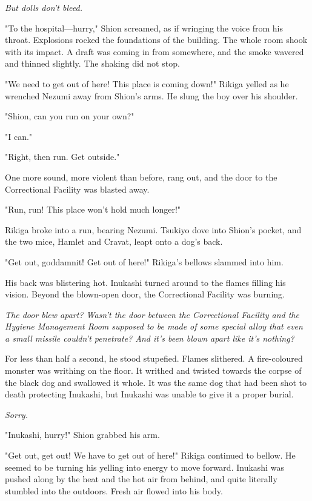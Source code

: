 \emph{But dolls don't bleed.}

"To the hospital---hurry," Shion screamed, as if wringing the voice from
his throat. Explosions rocked the foundations of the building. The whole
room shook with its impact. A draft was coming in from somewhere, and
the smoke wavered and thinned slightly. The shaking did not stop.

"We need to get out of here! This place is coming down!" Rikiga yelled
as he wrenched Nezumi away from Shion's arms. He slung the boy over his
shoulder.

"Shion, can you run on your own?"

"I can."

"Right, then run. Get outside."

One more sound, more violent than before, rang out, and the door to the
Correctional Facility was blasted away.

"Run, run! This place won't hold much longer!"

Rikiga broke into a run, bearing Nezumi. Tsukiyo dove into Shion's
pocket, and the two mice, Hamlet and Cravat, leapt onto a dog's back.

"Get out, goddamnit! Get out of here!" Rikiga's bellows slammed into
him.

His back was blistering hot. Inukashi turned around to the flames
filling his vision. Beyond the blown-open door, the Correctional
Facility was burning.

\emph{The door blew apart? Wasn't the door between the Correctional Facility
and the Hygiene Management Room supposed to be made of some special
alloy that even a small missile couldn't penetrate? And it's been blown
apart like it's nothing?}

For less than half a second, he stood stupefied. Flames slithered. A
fire-coloured monster was writhing on the floor. It writhed and twisted
towards the corpse of the black dog and swallowed it whole. It was the
same dog that had been shot to death protecting Inukashi, but Inukashi
was unable to give it a proper burial.

\emph{Sorry.}

"Inukashi, hurry!" Shion grabbed his arm.

"Get out, get out! We have to get out of here!" Rikiga continued to
bellow. He seemed to be turning his yelling into energy to move forward.
Inukashi was pushed along by the heat and the hot air from behind, and
quite literally stumbled into the outdoors. Fresh air flowed into his
body.

